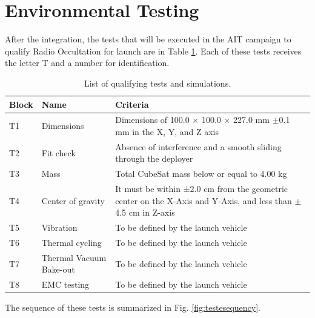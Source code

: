 \section{Environmental Testing}

After the integration, the tests that will be executed in the AIT campaign to qualify Radio Occultation for launch are in Table \ref{table_test}. Each of these tests receives the letter T and a number for identification. %

\begin{table}[!htb]
    \centering
    \begin{tabular}{lll}
        \toprule[1.5pt]
    	\textbf{Block} & \textbf{Name} & \textbf{Criteria} \\
    	\midrule
    	T1    & Dimensions                  & \parbox[t]{8cm}{Dimensions of 100.0 $\times$ 100.0 $\times$ 227.0 mm $\pm$0.1 mm in the X, Y, and Z axis} \\
        T2    & Fit check                   & \parbox[t]{8cm}{Absence of interference and a smooth sliding through the deployer} \\
    	T3    & Mass                        & Total CubeSat mass below or equal to 4.00 kg \\
    	T4    & Center of gravity           & \parbox[t]{8cm}{It must be within ±2.0 cm from the geometric center on the X-Axis and Y-Axis, and less than $\pm$4.5 cm in Z-axis} \\
        T5    & Vibration                   & To be defined by the launch vehicle \\
        T6    & Thermal cycling             & To be defined by the launch vehicle \\
        T7    & Thermal Vacuum Bake-out     & To be defined by the launch vehicle \\
        T8    & EMC testing                 & To be defined by the launch vehicle \\
        \bottomrule[1.5pt]
	\end{tabular}
    \caption{\label{table_test}List of qualifying tests and simulations.}
\end{table}

The sequence of these tests is summarized in Fig. \ref{fig:testesequency}.

